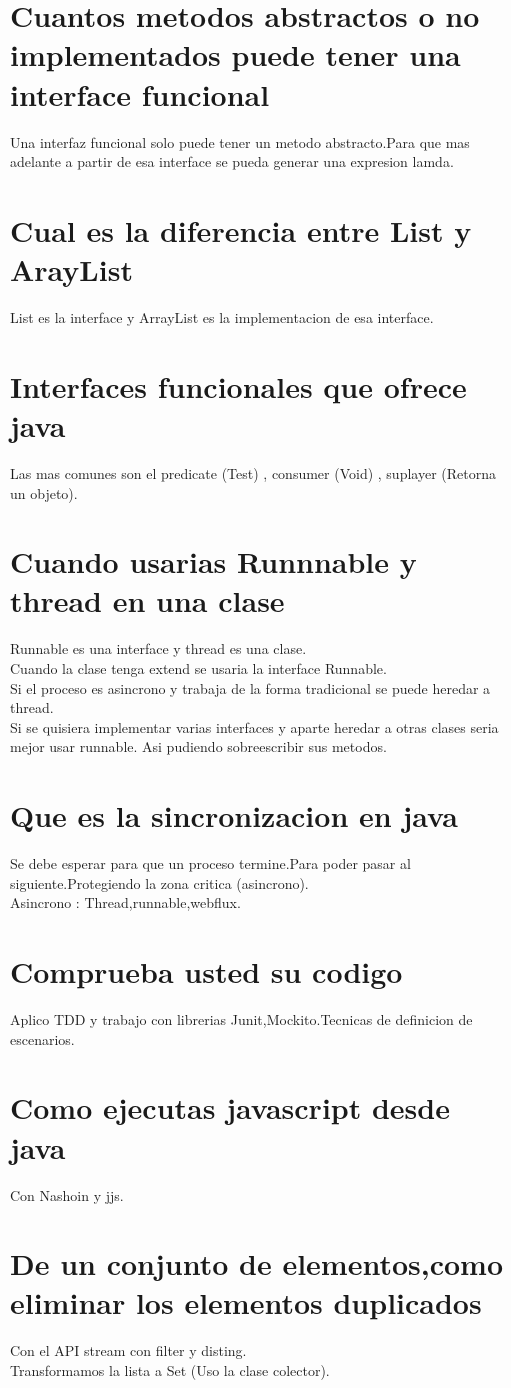 \section{Cuantos metodos abstractos o no implementados puede tener una interface funcional}
Una interfaz funcional solo puede tener un metodo abstracto.Para que mas adelante a partir de esa interface se pueda generar  una expresion lamda.
\section{Cual es la diferencia entre List y ArayList}
List es la interface y ArrayList es la implementacion de esa interface.
\section{Interfaces funcionales que ofrece java}
Las mas comunes son el predicate (Test) , consumer (Void) , suplayer (Retorna un objeto).
\section{Cuando usarias Runnnable y thread en una clase}
Runnable es una interface y thread es una clase.\\
Cuando la clase tenga extend se usaria la interface Runnable.\\
Si el proceso es asincrono y trabaja de la forma tradicional se puede heredar a thread.\\
Si se quisiera implementar varias interfaces y aparte heredar a otras clases seria mejor usar runnable.
Asi pudiendo sobreescribir sus metodos.
\section{Que es la sincronizacion en java}
Se debe esperar para que un proceso termine.Para poder pasar al siguiente.Protegiendo la zona critica (asincrono).\\
Asincrono : Thread,runnable,webflux.
\section{Comprueba usted su codigo}
Aplico TDD y trabajo con librerias Junit,Mockito.Tecnicas de definicion de escenarios.
\section{Como ejecutas javascript desde java}
Con Nashoin y jjs.
\section{De un conjunto de elementos,como eliminar los elementos duplicados}
Con el API stream con filter y disting.\\
Transformamos la lista a Set (Uso la clase colector).
